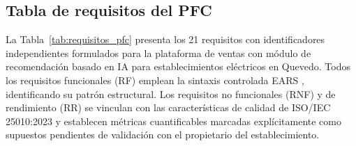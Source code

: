 \documentclass[onecolumn,12pt,a4paper]{IEEEtran}
\begin{document}
	\subsection{Tabla de requisitos del PFC}

	La Tabla~\ref{tab:requisitos_pfc} presenta los 21 requisitos con identificadores independientes formulados para la plataforma de ventas con m\'odulo de recomendaci\'on basado en IA para establecimientos el\'ectricos en Quevedo. Todos los requisitos funcionales (RF) emplean la sintaxis controlada EARS \cite{mavin2009}, identificando su patr\'on estructural. Los requisitos no funcionales (RNF) y de rendimiento (RR) se vinculan con las caracter\'isticas de calidad de ISO/IEC 25010:2023 \cite{iso25010} y establecen m\'etricas cuantificables marcadas expl\'icitamente como supuestos pendientes de validaci\'on con el propietario del establecimiento.
\end{document}
